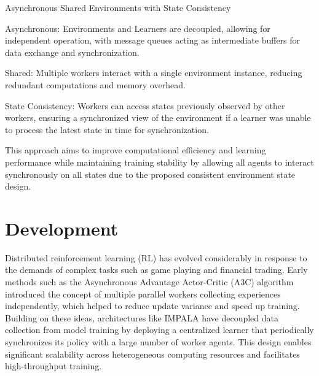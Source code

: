 

Asynchronous Shared Environments with State Consistency

Asynchronous: Environments and Learners are decoupled, allowing for independent operation,
with message queues acting as intermediate buffers for data exchange and synchronization.

Shared: Multiple workers interact with a single environment instance, reducing redundant computations and memory overhead.

State Consistency: Workers can access states previously observed by other workers, ensuring a synchronized view of the environment
if a learner was unable to process the latest state in time for synchronization.

This approach aims to improve computational efficiency and learning performance while maintaining training stability
by allowing all agents to interact synchronously on all states due to the proposed consistent environment state design.


\chapter{Development}
\label{ch:development}

Distributed reinforcement learning (RL) has evolved considerably in response to the demands of complex tasks such as game playing and financial trading.
Early methods such as the Asynchronous Advantage Actor-Critic (A3C)
algorithm introduced the concept of multiple parallel workers collecting experiences independently,
which helped to reduce update variance and speed up training.
Building on these ideas, architectures like IMPALA have decoupled data collection from model training by deploying a
centralized learner that periodically synchronizes its policy with a large number of worker agents.
This design enables significant scalability across heterogeneous computing resources and facilitates high-throughput training.

